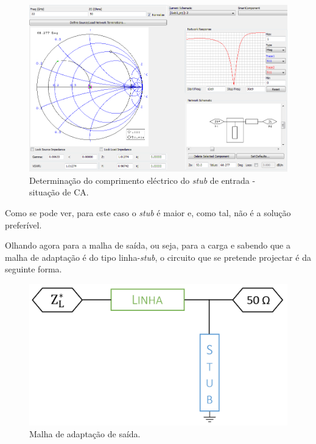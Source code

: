 \documentclass[11pt]{article}
\numberwithin{equation}{section}
\begin{document}
\begin{figure}[H]
	\centering
	\includegraphics[keepaspectratio=true, scale=0.45]{exps/Gerador_Ca_stub}
	\vspace{-0.5em}
	\caption{Determinação do comprimento eléctrico do \textit{stub} de entrada - situação de CA.}
	\vspace{-0.8em}
\end{figure}

Como se pode ver, para este caso o \textit{stub} é maior e, como tal, não é a solução preferível.

Olhando agora para a malha de saída, ou seja, para a carga e sabendo que a malha de adaptação é do tipo linha-\textit{stub}, o circuito que se pretende projectar é da seguinte forma.

\begin{figure}[H]
	\centering
	\includegraphics[keepaspectratio=true, scale=0.25]{teoricas/malhasaida}
	\vspace{-0.5em}
	\caption{Malha de adaptação de saída.}
	\vspace{-0.8em}
\end{figure}
\end{document}
